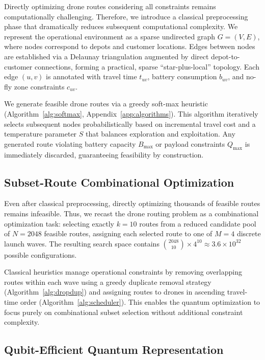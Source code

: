 Directly optimizing drone routes considering all constraints remains computationally challenging. Therefore, we introduce a classical preprocessing phase that dramatically reduces subsequent computational complexity. We represent the operational environment as a sparse undirected graph $G=(V,E)$, where nodes correspond to depots and customer locations. Edges between nodes are established via a Delaunay triangulation augmented by direct depot-to-customer connections, forming a practical, sparse ``star-plus-local'' topology. Each edge $(u,v)$ is annotated with travel time $t_{uv}$, battery consumption $b_{uv}$, and no-fly zone constraints $c_{uv}$.

We generate feasible drone routes via a greedy soft-max heuristic (Algorithm~\ref{alg:softmax}, Appendix~\ref{app:algorithms}). This algorithm iteratively selects subsequent nodes probabilistically based on incremental travel cost and a temperature parameter $S$ that balances exploration and exploitation. Any generated route violating battery capacity $B_{\max}$ or payload constraints $Q_{\max}$ is immediately discarded, guaranteeing feasibility by construction.

\subsection{Subset-Route Combinational Optimization}

Even after classical preprocessing, directly optimizing thousands of feasible routes remains infeasible. Thus, we recast the drone routing problem as a combinational optimization task: selecting exactly $k=10$ routes from a reduced candidate pool of $N=2048$ feasible routes, assigning each selected route to one of $M=4$ discrete launch waves. The resulting search space contains $\binom{2048}{10} \times 4^{10} \approx 3.6 \times 10^{32}$ possible configurations.

Classical heuristics manage operational constraints by removing overlapping routes within each wave using a greedy duplicate removal strategy (Algorithm~\ref{alg:dropdup}) and assigning routes to drones in ascending travel-time order (Algorithm~\ref{alg:scheduler}). This enables the quantum optimization to focus purely on combinational subset selection without additional constraint complexity.

\subsection{Qubit-Efficient Quantum Representation}

